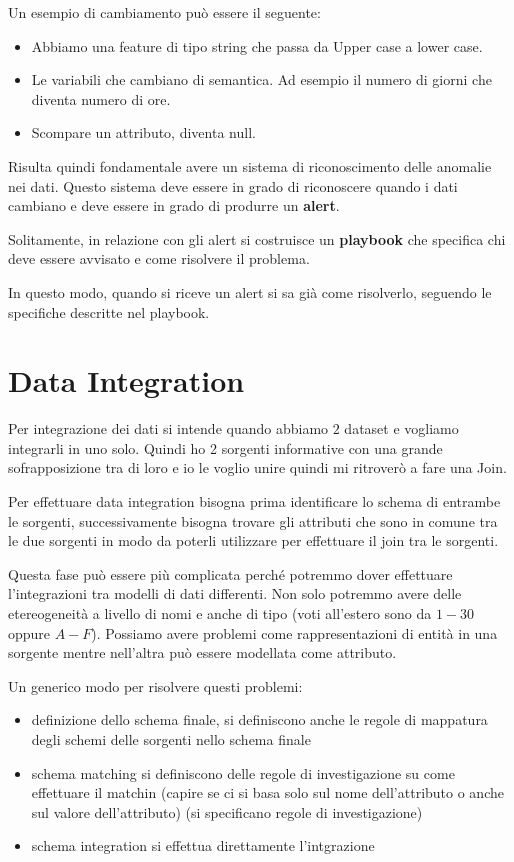 Un esempio di cambiamento può essere il seguente:
\begin{itemize}
    \item Abbiamo una feature di tipo string che passa da Upper case a lower case.
    \item Le variabili che cambiano di semantica. Ad esempio il numero di giorni
          che diventa numero di ore.
    \item Scompare un attributo, diventa null.
\end{itemize}
Risulta quindi fondamentale avere un sistema di riconoscimento delle anomalie
nei dati. Questo sistema deve essere in grado di riconoscere quando i dati cambiano
e deve essere in grado di produrre un \textbf{alert}. 

Solitamente, in relazione con gli alert si costruisce un \textbf{playbook} che
specifica chi deve essere avvisato e come risolvere il problema.

In questo modo, quando si riceve un alert si sa già come risolverlo, seguendo 
le specifiche descritte nel playbook.

\section{Data Integration}
Per integrazione dei dati si intende quando abbiamo $2$ dataset e vogliamo integrarli 
in uno solo. Quindi ho 2 sorgenti informative con una grande sofrapposizione tra di loro 
e io le voglio unire quindi mi ritroverò a fare una Join.

Per effettuare data integration bisogna prima identificare lo schema di entrambe 
le sorgenti, successivamente bisogna trovare gli attributi che sono in comune 
tra le due sorgenti in modo da poterli utilizzare per effettuare il join tra le sorgenti.

Questa fase può essere più complicata perché potremmo dover effettuare l'integrazioni
tra modelli di dati differenti. Non solo potremmo avere delle etereogeneità a livello 
di nomi e anche di tipo (voti all'estero sono da $1-30$ oppure $A-F$). Possiamo avere 
problemi come rappresentazioni di entità in una sorgente mentre nell'altra può 
essere modellata come attributo.

Un generico modo per risolvere questi problemi:
\begin{itemize}
      \item definizione dello schema finale, si definiscono anche le regole di mappatura
      degli schemi delle sorgenti nello schema finale
      \item schema matching si definiscono delle regole di investigazione su come 
      effettuare il matchin (capire se ci si basa solo sul nome dell'attributo o 
      anche sul valore dell'attributo) (si specificano regole di investigazione)
      \item schema integration si effettua direttamente l'intgrazione 
\end{itemize}

